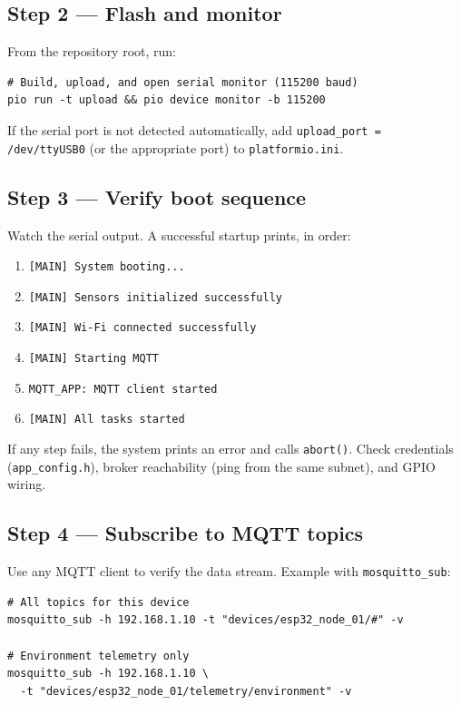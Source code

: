 \documentclass[11pt,a4paper]{article}
\begin{document}
\subsection{Step 2 --- Flash and monitor}

From the repository root, run:

\begin{verbatim}
# Build, upload, and open serial monitor (115200 baud)
pio run -t upload && pio device monitor -b 115200
\end{verbatim}

If the serial port is not detected automatically, add \texttt{upload\_port = /dev/ttyUSB0}
(or the appropriate port) to \texttt{platformio.ini}.

\subsection{Step 3 --- Verify boot sequence}

Watch the serial output. A successful startup prints, in order:

\begin{enumerate}[leftmargin=*, label=\textbf{\arabic*.}]
    \item \texttt{[MAIN] System booting...}
    \item \texttt{[MAIN] Sensors initialized successfully}
    \item \texttt{[MAIN] Wi-Fi connected successfully}
    \item \texttt{[MAIN] Starting MQTT}
    \item \texttt{MQTT\_APP: MQTT client started}
    \item \texttt{[MAIN] All tasks started}
\end{enumerate}

If any step fails, the system prints an error and calls \texttt{abort()}. Check credentials
(\texttt{app\_config.h}), broker reachability (ping from the same subnet), and GPIO wiring.

\newpage
\subsection{Step 4 --- Subscribe to MQTT topics}

Use any MQTT client to verify the data stream. Example with \texttt{mosquitto\_sub}:

\begin{verbatim}
# All topics for this device
mosquitto_sub -h 192.168.1.10 -t "devices/esp32_node_01/#" -v

# Environment telemetry only
mosquitto_sub -h 192.168.1.10 \
  -t "devices/esp32_node_01/telemetry/environment" -v
\end{verbatim}
\end{document}
